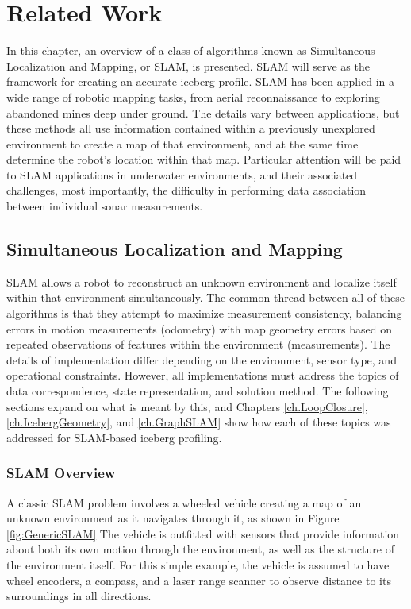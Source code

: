 
\chapter{Related Work}
\label{ch.RelatedWork}

In this chapter, an overview of a class of algorithms known as Simultaneous Localization and Mapping, or SLAM, is presented. SLAM will serve as the framework for creating an accurate iceberg profile. SLAM has been applied  in a wide range of robotic mapping tasks, from aerial reconnaissance to exploring abandoned mines deep under ground. The details vary between applications, but these methods all use information contained within a previously unexplored environment to create a map of that environment, and at the same time determine the robot's location within that map. Particular attention will be paid to SLAM applications in underwater environments, and their associated challenges, most importantly, the difficulty in performing data association between individual sonar measurements. 

\section{Simultaneous Localization and Mapping}
\label{sec.SLAM}

SLAM allows a robot to reconstruct an unknown environment and localize itself within that environment simultaneously.  The common thread between all of these algorithms is that they attempt to maximize measurement consistency, balancing errors in motion measurements (odometry) with map geometry errors based on repeated observations of features within the environment (measurements). The details of implementation differ depending on the environment, sensor type, and operational constraints. However, all implementations must address the topics of data correspondence, state representation, and solution method. The following sections expand on what is meant by this, and Chapters \ref{ch.LoopClosure}, \ref{ch.IcebergGeometry}, and \ref{ch.GraphSLAM} show how each of these topics was addressed for SLAM-based iceberg profiling.

\subsection{SLAM Overview}

\label{sec:genericSLAM}
A classic SLAM problem involves a wheeled vehicle creating a map of an unknown environment as it navigates through it, as shown in Figure \ref{fig:GenericSLAM} The vehicle is outfitted with sensors that provide information about both its own motion through the environment, as well as the structure of the environment itself. For this simple example, the vehicle is assumed to have wheel encoders, a compass, and a laser range scanner to observe distance to its surroundings in all directions.

